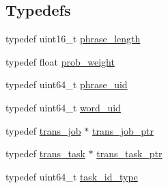 \subsection*{Typedefs}
\begin{DoxyCompactItemize}
\item 
typedef uint16\+\_\+t \hyperlink{namespaceuva_1_1smt_1_1bpbd_1_1server_af068a19c2e03116caf3e3827a3e40e35}{phrase\+\_\+length}
\item 
typedef float \hyperlink{namespaceuva_1_1smt_1_1bpbd_1_1server_a01e9ea4de9c226f4464862e84ff0bbcc}{prob\+\_\+weight}
\item 
typedef uint64\+\_\+t \hyperlink{namespaceuva_1_1smt_1_1bpbd_1_1server_ad18d4cdf5504e76c22b0c124ff60b44f}{phrase\+\_\+uid}
\item 
typedef uint64\+\_\+t \hyperlink{namespaceuva_1_1smt_1_1bpbd_1_1server_a6bfe45ba344d65a7fdd7d26156328ddc}{word\+\_\+uid}
\item 
typedef \hyperlink{classuva_1_1smt_1_1bpbd_1_1server_1_1trans__job}{trans\+\_\+job} $\ast$ \hyperlink{namespaceuva_1_1smt_1_1bpbd_1_1server_acb76132c82e66b5dbf7e3aa0e5af2580}{trans\+\_\+job\+\_\+ptr}
\item 
typedef \hyperlink{classuva_1_1smt_1_1bpbd_1_1server_1_1trans__task}{trans\+\_\+task} $\ast$ \hyperlink{namespaceuva_1_1smt_1_1bpbd_1_1server_a4dea4bb1185fe5d148be18ad12fea74a}{trans\+\_\+task\+\_\+ptr}
\item 
typedef uint64\+\_\+t \hyperlink{namespaceuva_1_1smt_1_1bpbd_1_1server_a67f8b384118030b4ae63f1239253f9ed}{task\+\_\+id\+\_\+type}
\end{DoxyCompactItemize}
